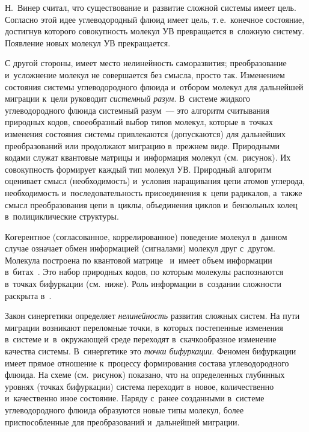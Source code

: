 \begin{multicols}{2}
    Н.~Винер считал, что существование и~развитие сложной системы имеет 
цель. Согласно этой идее углеводородный флю\-ид имеет цель, т.\,е.\ конечное состояние, 
достигнув которого совокупность молекул УВ превращается в~сложную систему. 
Появление новых молекул УВ прекращается. 
    
    С другой стороны, имеет место нелинейность саморазвития; преобразование и~усложнение молекул не совершается без смысла, просто так. Изменением 
состояния системы углеводородного флю\-ида и~отбором молекул для дальнейшей миграции 
к~цели руководит \textit{системный разум}. В~системе жидкого углеводородного флю\-ида 
системный разум~--- это\linebreak
 алгоритм считывания природных кодов, своеобразный 
выбор типов молекул, которые в~точках изменения состояния сис\-те\-мы 
привлекаются (допускаются) для дальнейших преобразований или \mbox{продолжают} 
миграцию в~преж\-нем виде. Природными кодами служат квантовые мат\-ри\-цы 
и~информация молекул (см.\ рисунок). Их совокупность формирует каждый тип 
молекул УВ. Природный алгоритм оценивает смысл (необходимость) и~условия 
наращивания цепи атомов углерода,  необходимость 
и~последовательность присоединения к~цепи радикалов, а~также смысл 
преобразования цепи в~циклы, объединения циклов и~бензольных колец 
в~полициклические структуры.
    
    Когерентное (согласованное, коррелированное) поведение молекул в~данном 
случае означает обмен информацией (сигналами) молекул друг с~другом. 
Молекула построена по квантовой матрице~\cite{3-s} и~имеет объем информации 
в~битах~\cite[с.~129--132]{2-s}. Это набор природных кодов, по которым 
молекулы распознаются в~точках бифуркации (см.\ ниже). Роль информации 
в~создании сложности раскрыта в~\cite[с.~212--217]{8-s}.
    
    Закон синергетики определяет \textit{нелинейность} развития сложных 
систем. На пути миграции возникают переломные точки, в~которых постепенные 
изменения в~системе и~в~окружающей среде переходят в~скачкообразное 
изменение качества системы. В~синергетике это \textit{точки бифуркации}. 
Феномен бифуркации имеет прямое отношение к~процессу формирования со\-ста\-ва  
углеводородного флю\-ида. На схеме (см.\ рисунок) показано, что на определенных глубинных 
уровнях (точках бифуркации) система переходит в~новое, количественно 
и~качественно иное состояние. Наряду с~ранее созданными в~сис\-те\-ме  
углеводородного флю\-ида образуются новые типы молекул, более приспособленные для 
преобразований и~дальнейшей миграции.
    

\end{multicols}
